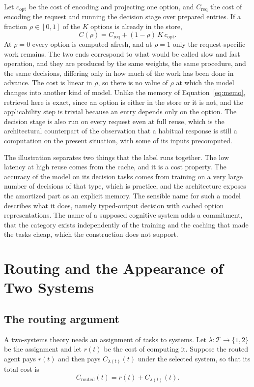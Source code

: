 \documentclass[11pt]{report}
\newcommand{\T}{\mathcal{T}}
\theoremstyle{remark}
\theoremstyle{definition}
\begin{document}
Let $c_{\mathrm{opt}}$ be the cost of encoding and projecting one option, and $C_{\mathrm{req}}$ the cost of encoding the request and running the decision stage over prepared entries. If a fraction $\rho\in[0,1]$ of the $K$ options is already in the store,
\begin{equation}
C(\rho)=C_{\mathrm{req}}+(1-\rho)\,K\,c_{\mathrm{opt}} .
\end{equation}
At $\rho=0$ every option is computed afresh, and at $\rho=1$ only the request-specific work remains. The two ends correspond to what would be called slow and fast operation, and they are produced by the same weights, the same procedure, and the same decisions, differing only in how much of the work has been done in advance. The cost is linear in $\rho$, so there is no value of $\rho$ at which the model changes into another kind of model. Unlike the memory of Equation~\eqref{eq:memo}, retrieval here is exact, since an option is either in the store or it is not, and the applicability step is trivial because an entry depends only on the option. The decision stage is also run on every request even at full reuse, which is the architectural counterpart of the observation that a habitual response is still a computation on the present situation, with some of its inputs precomputed.

The illustration separates two things that the label runs together. The low latency at high reuse comes from the cache, and it is a cost property. The accuracy of the model on its decision tasks comes from training on a very large number of decisions of that type, which is practice, and the architecture exposes the amortized part as an explicit memory. The sensible name for such a model describes what it does, namely typed-output decision with cached option representations. The name of a supposed cognitive system adds a commitment, that the category exists independently of the training and the caching that made the tasks cheap, which the construction does not support.

\chapter{Routing and the Appearance of Two Systems}\label{ch:routing}

\section{The routing argument}

A two-systems theory needs an assignment of tasks to systems. Let $\lambda:\T\to\{1,2\}$ be the assignment and let $r(t)$ be the cost of computing it. Suppose the routed agent pays $r(t)$ and then pays $C_{\lambda(t)}(t)$ under the selected system, so that its total cost is
\begin{equation}
C_{\mathrm{routed}}(t)=r(t)+C_{\lambda(t)}(t).
\end{equation}
\end{document}
